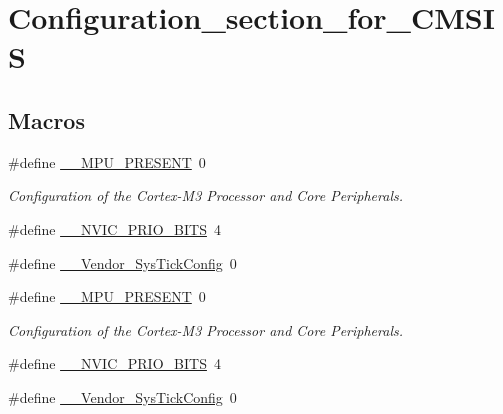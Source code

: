 \hypertarget{group___configuration__section__for___c_m_s_i_s}{}\section{Configuration\+\_\+section\+\_\+for\+\_\+\+C\+M\+S\+IS}
\label{group___configuration__section__for___c_m_s_i_s}
\subsection*{Macros}
\begin{DoxyCompactItemize}
\item 
\#define \hyperlink{group___configuration__section__for___c_m_s_i_s_ga4127d1b31aaf336fab3d7329d117f448}{\+\_\+\+\_\+\+M\+P\+U\+\_\+\+P\+R\+E\+S\+E\+NT}~0
\begin{DoxyCompactList}\small\item\em Configuration of the Cortex-\/\+M3 Processor and Core Peripherals. \end{DoxyCompactList}\item 
\#define \hyperlink{group___configuration__section__for___c_m_s_i_s_gae3fe3587d5100c787e02102ce3944460}{\+\_\+\+\_\+\+N\+V\+I\+C\+\_\+\+P\+R\+I\+O\+\_\+\+B\+I\+TS}~4
\item 
\#define \hyperlink{group___configuration__section__for___c_m_s_i_s_gab58771b4ec03f9bdddc84770f7c95c68}{\+\_\+\+\_\+\+Vendor\+\_\+\+Sys\+Tick\+Config}~0
\item 
\#define \hyperlink{group___configuration__section__for___c_m_s_i_s_ga4127d1b31aaf336fab3d7329d117f448}{\+\_\+\+\_\+\+M\+P\+U\+\_\+\+P\+R\+E\+S\+E\+NT}~0
\begin{DoxyCompactList}\small\item\em Configuration of the Cortex-\/\+M3 Processor and Core Peripherals. \end{DoxyCompactList}\item 
\#define \hyperlink{group___configuration__section__for___c_m_s_i_s_gae3fe3587d5100c787e02102ce3944460}{\+\_\+\+\_\+\+N\+V\+I\+C\+\_\+\+P\+R\+I\+O\+\_\+\+B\+I\+TS}~4
\item 
\#define \hyperlink{group___configuration__section__for___c_m_s_i_s_gab58771b4ec03f9bdddc84770f7c95c68}{\+\_\+\+\_\+\+Vendor\+\_\+\+Sys\+Tick\+Config}~0
\end{DoxyCompactItemize}
